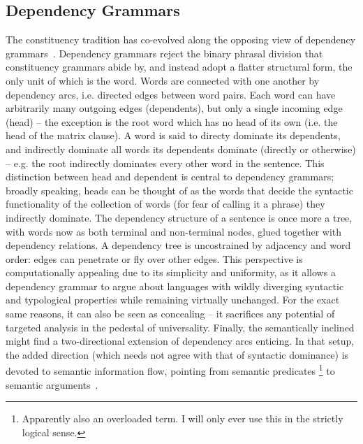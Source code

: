 \subsection{Dependency Grammars}
The constituency tradition has co-evolved along the opposing view of dependency grammars~\cite[\textit{inter alia}]{tesniere2015elements,sgall1986meaning,mel1988dependency,sleator1995parsing}.
Dependency grammars reject the binary phrasal division that constituency grammars abide by, and instead adopt a flatter structural form, the only unit of which is the word.
Words are connected with one another by dependency arcs, i.e. directed edges between word pairs.
Each word can have arbitrarily many outgoing edges (dependents), but only a single incoming edge (head) -- the exception is the root word which has no head of its own (i.e. the head of the matrix clause).
A word is said to directy dominate its dependents, and indirectly dominate all words its dependents dominate (directly or otherwise) -- e.g. the root indirectly dominates every other word in the sentence.
This distinction between head and dependent is central to dependency grammars; broadly speaking, heads can be thought of as the words that decide the syntactic functionality of the collection of words (for fear of calling it a phrase) they indirectly dominate.
The dependency structure of a sentence is once more a tree, with words now as both terminal and non-terminal nodes, glued together with dependency relations.
A dependency tree is uncostrained by adjacency and word order: edges can penetrate or fly over other edges.
This perspective is computationally appealing due to its simplicity and uniformity, as it allows a dependency grammar to argue about languages with wildly diverging syntactic and typological properties while remaining virtually unchanged.
For the exact same reasons, it can also be seen as concealing -- it sacrifices any potential of targeted analysis in the pedestal of universality.
Finally, the semantically inclined might find a two-directional extension of dependency arcs enticing.
In that setup, the added direction (which needs not agree with that of syntactic dominance) is devoted to semantic information flow, pointing from semantic predicates%
	\footnote{Apparently also an overloaded term. I will only ever use this in the strictly logical sense.}
 to semantic arguments~\cite{mel2003levels}.

